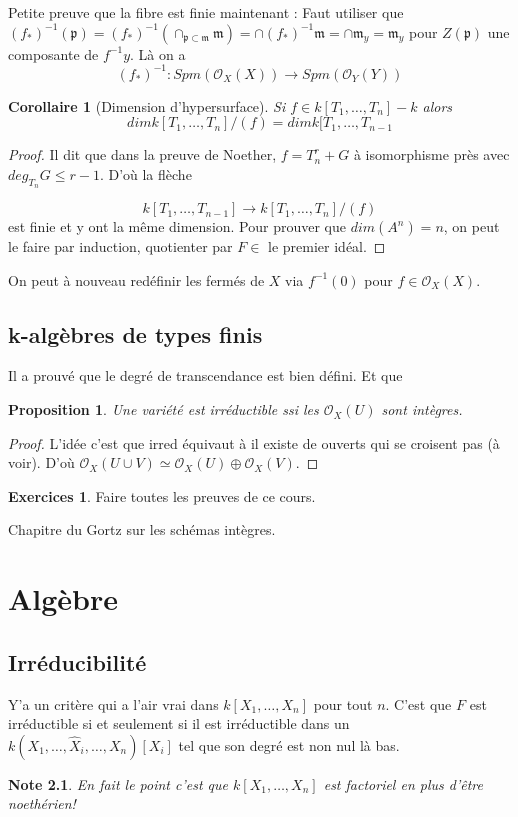 \documentclass[a4paper,12pt]{book}
\newcommand{\Or}{\mathcal{O}}
\newcommand{\m}{\mathfrak{m}}
\newcommand{\p}{\mathfrak{p}}
\theoremstyle{plain}
\newtheorem{prop}[subsection]{Proposition}
\newtheorem{cor}[subsection]{Corollaire}
\newtheorem{note}{Note}
\theoremstyle{definition}
\newtheorem{exo}[subsection]{Exercices}
\theoremstyle{remark}
\begin{document}
Petite preuve que la fibre est finie maintenant : Faut utiliser
que $(f_*)^{-1}(\p)=(f_*)^{-1}(\cap_{\p\subset\m}\m)=\cap (f_*)^{-1}\m =
\cap \m_y=\m_y$ pour $Z(\p)$ une composante de $f^{-1}y$. Là on a 
\[(f_*)^{-1}\colon Spm(\Or_X(X))\to Spm(\Or_Y(Y))\]

\begin{cor}[Dimension d'hypersurface]
    Si $f\in k[T_1,\ldots,T_n]-k$ alors
    \[dim k[T_1,\ldots,T_n]/(f)=dim k[T_1,\ldots, T_{n-1}\]
\end{cor}
\begin{proof}
    Il dit que dans la preuve de Noether, $f=T_n^r+G$ à isomorphisme
    près avec $deg_{T_n}G\leq r-1$. D'où la flèche 

    \[k[T_1,\ldots,T_{n-1}]\to k[T_1,\ldots, T_n]/(f)\]
    est finie et y ont la même dimension. Pour prouver que 
    $dim(A^n)=n$, on peut le faire par induction, quotienter par $F\in$
    le premier idéal. 
\end{proof}

On peut à nouveau redéfinir les fermés de $X$ via $f^{-1}(0)$ pour 
$f\in\Or_X(X)$.
\section{k-algèbres de types finis}
Il a prouvé que le degré de transcendance est bien défini. Et que
\begin{prop}
    Une variété est irréductible ssi les $\Or_X(U)$ sont intègres.
\end{prop}
\begin{proof}
    L'idée c'est que irred équivaut à il existe de ouverts qui se 
    croisent pas (à voir). D'où 
    $\Or_X(U\cup V)\simeq\Or_X(U)\oplus \Or_X(V)$.
\end{proof}
\begin{exo}
    Faire toutes les preuves de ce cours.
\end{exo}

Chapitre du Gortz sur les schémas intègres.

\chapter{Algèbre}
\section{Irréducibilité}
Y'a un critère qui a l'air vrai dans $k[X_1,\ldots,X_n]$ pour tout 
$n$. C'est que $F$ est irréductible si et seulement si il est
irréductible dans un $k(X_1,\ldots,\widehat X_i,\ldots,X_n)[X_i]$
tel que son degré est non nul là bas.

\begin{note}
    En fait le point c'est que $k[X_1,\ldots,X_n]$ est factoriel en
    plus d'être noethérien!
\end{note}

\printbibliography
\end{document}
